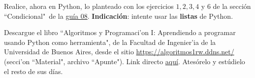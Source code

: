 \documentclass[11pt]{exam}
\begin{document}
\begin{questions}



\item Realice, ahora en Python, lo planteado con los ejercicios $1,2,3,4$ y $6$ de la sección ``Condicional"\, de la \href{https://udec.instructure.com/courses/17852/files/1301010?module_item_id=673055}{guía 08}. \textbf{Indicación}: intente usar las \textbf{listas} de Python.

\item Descargue el libro ``Algoritmos y Programaci'on I: Aprendiendo a programar usando Python como herramienta", de la Facultad de Ingenier'ia de la Universidad de Buenos Aires, desde el sitio \url{https://algoritmos1rw.ddns.net/} (secci'on ``Material", archivo ``Apunte"). Link directo \href{https://drive.google.com/file/d/0B0KKEIBDHL7tdEQ3bFZ2M3VrZzA/view}{aqu\'i}. Atesórelo y estúdielo el resto de sus días.
\end{questions}
\end{document}
